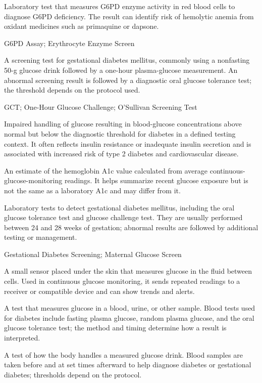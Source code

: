  Laboratory test that measures G6PD enzyme activity in red blood cells to diagnose G6PD deficiency. The result can identify risk of hemolytic anemia from oxidant medicines such as primaquine or dapsone.

\synonyms
G6PD Assay; Erythrocyte Enzyme Screen

 A screening test for gestational diabetes mellitus, commonly using a nonfasting 50-g glucose drink followed by a one-hour plasma-glucose measurement.
An abnormal screening result is followed by a diagnostic oral glucose tolerance test; the threshold depends on the protocol used.

\synonyms
GCT; One-Hour Glucose Challenge; O'Sullivan Screening Test

 Impaired handling of glucose resulting in blood-glucose concentrations above normal but
below the diagnostic threshold for diabetes in a defined testing context. It often
reflects insulin resistance or inadequate insulin secretion and is associated with
increased risk of type 2 diabetes and cardiovascular disease.

 An estimate of the hemoglobin A1c value calculated from average continuous-glucose-monitoring readings. It helps summarize recent glucose exposure but is not the same as a laboratory A1c and may differ from it.

 Laboratory tests to detect gestational diabetes mellitus, including the oral glucose tolerance test and glucose challenge test. They are usually performed between 24 and 28 weeks of gestation; abnormal results are followed by additional testing or management.

\synonyms
Gestational Diabetes Screening; Maternal Glucose Screen

 A small sensor placed under the skin that measures glucose in the fluid between cells. Used in continuous glucose monitoring, it sends repeated readings to a receiver or compatible device and can show trends and alerts.

 A test that measures glucose in a blood, urine, or other sample. Blood tests used for diabetes include fasting plasma glucose, random plasma glucose, and the oral glucose tolerance test; the method and timing determine how a result is interpreted.

 A test of how the body handles a measured glucose drink. Blood samples are taken before and at set times afterward to help diagnose diabetes or gestational diabetes; thresholds depend on the protocol.

